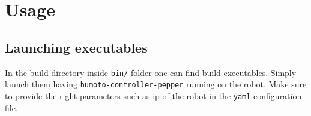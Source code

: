 \section{Usage}
\subsection{Launching executables}
\noindent In the build directory inside \texttt{bin/} folder one can find build executables. Simply launch them 
having \texttt{humoto-controller-pepper} running on the robot. Make sure to provide the right parameters such as ip of
the robot in the \texttt{yaml} configuration file.
